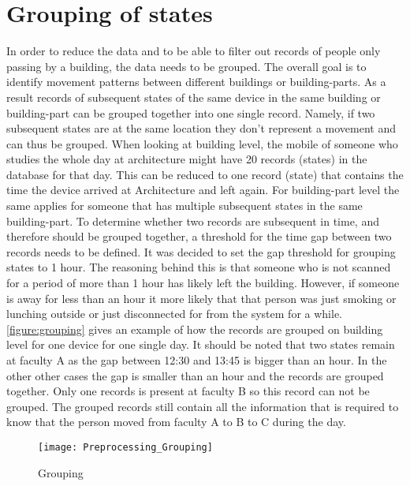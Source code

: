 \section{Grouping of states}\label{grouping}
In order to reduce the data and to be able to filter out records of people only passing by a building, the data needs to be grouped. The overall goal is to identify movement patterns between different buildings or building-parts. As a result records of subsequent states of the same device in the same building or building-part can be grouped together into one single record. Namely, if two subsequent states are at the same location they don’t represent a movement and can thus be grouped. When looking at building level, the mobile of someone who studies the whole day at architecture might have 20 records (states) in the database for that day. This can be reduced to one record (state) that contains the time the device arrived at Architecture and left again. For building-part level the same applies for someone that has multiple subsequent states in the same building-part. To determine whether two records are subsequent in time, and therefore should be grouped together, a threshold for the time gap between two records needs to be defined. It was decided to set the gap threshold for grouping states to 1 hour. The reasoning behind this is that someone who is not scanned for a period of more than 1 hour has likely left the building. However, if someone is away for less than an hour it more likely that that person was just smoking or lunching outside or just disconnected for from the system for a while. \autoref{figure:grouping} gives an example of how the records are grouped on building level for one device for one single day. It should be noted that two states remain at faculty A as the gap between 12:30 and 13:45 is bigger than an hour. In the other other cases the gap is smaller than an hour and the records are grouped together. Only one records is present at faculty B so this record can not be grouped. The grouped records still contain all the information that is required to know that the person moved from faculty A to B to C during the day. 

\begin{figure}[H]
\centering
\texttt{[image: Preprocessing\_Grouping]}
\captionsetup{justification=centering}
\caption{Grouping}
\label{figure:grouping}
\end{figure}

